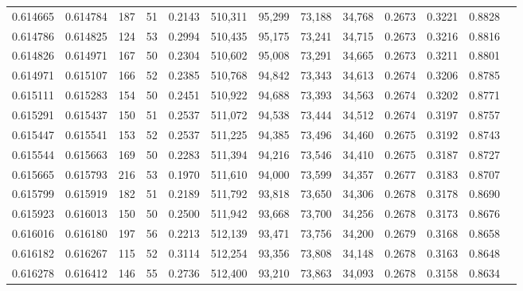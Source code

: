 \begin{tabular}{rrrrrrrrrrrrr}
0.614665 & 0.614784 &   187 &  51 &                                     0.2143 & 510,311 &  95,299 &  73,188 &  34,768 & 0.2673 & 0.3221 & 0.8828 \\
0.614786 & 0.614825 &   124 &  53 &                                     0.2994 & 510,435 &  95,175 &  73,241 &  34,715 & 0.2673 & 0.3216 & 0.8816 \\
0.614826 & 0.614971 &   167 &  50 &                                     0.2304 & 510,602 &  95,008 &  73,291 &  34,665 & 0.2673 & 0.3211 & 0.8801 \\
0.614971 & 0.615107 &   166 &  52 &                                     0.2385 & 510,768 &  94,842 &  73,343 &  34,613 & 0.2674 & 0.3206 & 0.8785 \\
0.615111 & 0.615283 &   154 &  50 &                                     0.2451 & 510,922 &  94,688 &  73,393 &  34,563 & 0.2674 & 0.3202 & 0.8771 \\
0.615291 & 0.615437 &   150 &  51 &                                     0.2537 & 511,072 &  94,538 &  73,444 &  34,512 & 0.2674 & 0.3197 & 0.8757 \\
0.615447 & 0.615541 &   153 &  52 &                                     0.2537 & 511,225 &  94,385 &  73,496 &  34,460 & 0.2675 & 0.3192 & 0.8743 \\
0.615544 & 0.615663 &   169 &  50 &                                     0.2283 & 511,394 &  94,216 &  73,546 &  34,410 & 0.2675 & 0.3187 & 0.8727 \\
0.615665 & 0.615793 &   216 &  53 &                                     0.1970 & 511,610 &  94,000 &  73,599 &  34,357 & 0.2677 & 0.3183 & 0.8707 \\
0.615799 & 0.615919 &   182 &  51 &                                     0.2189 & 511,792 &  93,818 &  73,650 &  34,306 & 0.2678 & 0.3178 & 0.8690 \\
0.615923 & 0.616013 &   150 &  50 &                                     0.2500 & 511,942 &  93,668 &  73,700 &  34,256 & 0.2678 & 0.3173 & 0.8676 \\
0.616016 & 0.616180 &   197 &  56 &                                     0.2213 & 512,139 &  93,471 &  73,756 &  34,200 & 0.2679 & 0.3168 & 0.8658 \\
0.616182 & 0.616267 &   115 &  52 &                                     0.3114 & 512,254 &  93,356 &  73,808 &  34,148 & 0.2678 & 0.3163 & 0.8648 \\
0.616278 & 0.616412 &   146 &  55 &                                     0.2736 & 512,400 &  93,210 &  73,863 &  34,093 & 0.2678 & 0.3158 & 0.8634 \\

\end{tabular}
